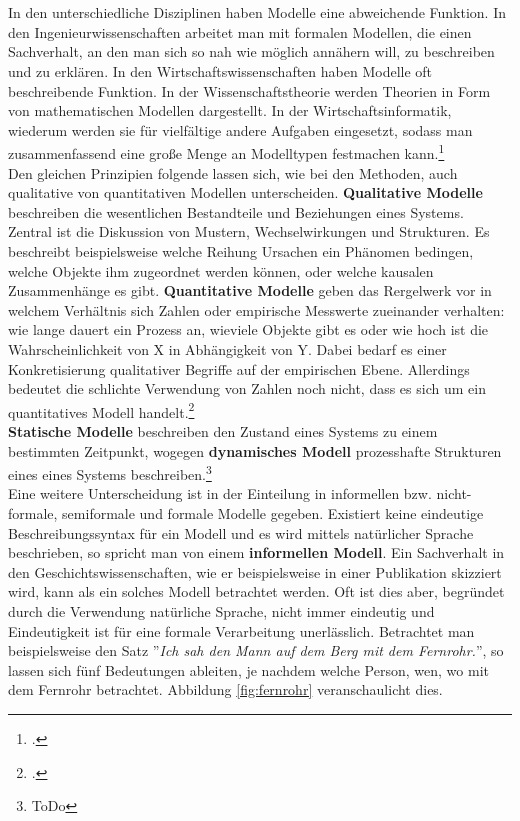\documentclass[12pt,a4paper]{article}
\begin{document}
\\
\\
In den unterschiedliche Disziplinen haben Modelle eine abweichende Funktion. In den Ingenieurwissenschaften arbeitet man mit formalen Modellen, die einen Sachverhalt, an den man sich so nah wie möglich annähern will, zu  beschreiben und zu erklären. In den Wirtschaftswissenschaften haben Modelle oft beschreibende Funktion. In der Wissenschaftstheorie werden Theorien in Form von mathematischen Modellen dargestellt. In der Wirtschaftsinformatik, wiederum werden sie für vielfältige andere Aufgaben eingesetzt, sodass man zusammenfassend eine große Menge an Modelltypen festmachen kann.\footcite[][S.41-44]{kobler2010qualitat}
\\
Den gleichen Prinzipien folgende lassen sich, wie bei den Methoden, auch qualitative von quantitativen Modellen unterscheiden. \textbf{Qualitative Modelle} beschreiben die wesentlichen Bestandteile und Beziehungen eines Systems. Zentral ist die Diskussion von Mustern, Wechselwirkungen und Strukturen. Es beschreibt beispielsweise welche Reihung Ursachen ein Phänomen bedingen, welche Objekte ihm zugeordnet werden können, oder welche kausalen Zusammenhänge es gibt. \textbf{Quantitative Modelle} geben das Rergelwerk vor in welchem Verhältnis sich Zahlen oder empirische Messwerte zueinander verhalten: wie lange dauert ein Prozess an, wieviele Objekte gibt es oder wie hoch ist die Wahrscheinlichkeit von X in Abhängigkeit von Y. Dabei bedarf es einer Konkretisierung qualitativer Begriffe auf der empirischen Ebene. Allerdings bedeutet die schlichte Verwendung von Zahlen noch nicht, dass es sich um ein quantitatives Modell handelt.\footcite[][S.309–329]{wolf1995qualitative}
\\
\textbf{Statische Modelle} beschreiben den Zustand eines Systems zu einem bestimmten Zeitpunkt, wogegen \textbf{dynamisches Modell} prozesshafte Strukturen eines eines Systems beschreiben.\footnote{ToDo}
\\
Eine weitere Unterscheidung ist in der Einteilung in informellen bzw. nicht-formale, semiformale und formale Modelle gegeben. Existiert keine eindeutige Beschreibungssyntax für ein Modell und es wird mittels natürlicher Sprache beschrieben, so spricht man von einem \textbf{informellen Modell}. Ein Sachverhalt in den Geschichtswissenschaften, wie er beispielsweise in einer Publikation skizziert wird, kann als ein solches Modell betrachtet werden. Oft ist dies aber, begründet durch die Verwendung natürliche Sprache, nicht immer eindeutig und Eindeutigkeit ist für eine formale Verarbeitung unerlässlich. Betrachtet man beispielsweise den Satz ''\textit{Ich sah den Mann auf dem Berg mit dem Fernrohr.}'', so lassen sich fünf Bedeutungen ableiten, je nachdem welche Person, wen, wo mit dem Fernrohr betrachtet. Abbildung \ref{fig:fernrohr} veranschaulicht dies.
\end{document}
